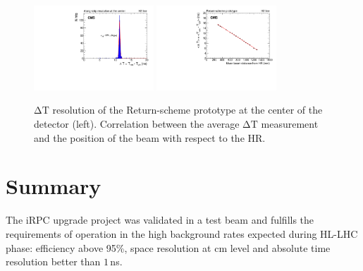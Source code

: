\documentclass{PoS}
\newcommand{\DT}{\mathrm{\Delta T}}
\begin{document}
\begin{figure}
  \begin{center}
    \includegraphics[width=0.40\textwidth]{figs/400.pdf}
    \includegraphics[width=0.40\textwidth]{figs/Position.pdf}
  \end{center}
 \caption{$\DT$ resolution of the Return-scheme prototype at the center of the detector (left). Correlation between the average $\DT$ measurement and the position of the beam with respect to the HR.} \label{fig.DT}
\end{figure}

\section*{Summary}

The iRPC upgrade project was validated in a test beam and fulfills the requirements of operation in the high background rates expected during HL-LHC phase: efficiency above 95\%, space resolution at cm level and absolute time resolution better than $1$\,ns. 



\end{document}
